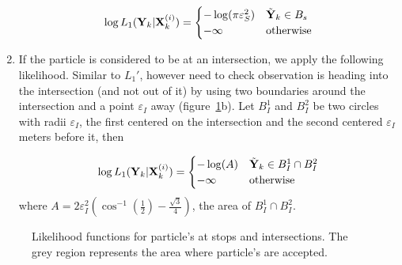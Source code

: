 \documentclass[draftcls,a4paper,onecolumn]{IEEEtran}\usepackage[]{graphicx}\usepackage[]{color}
\newenvironment{knitrout}{}{} %
\begin{document}
\begin{enumerate}
\begin{equation}
  \label{eq:l1b}
  \log L_1(\mathbf{Y}_k | \mathbf{X}_k^{(i)})=
  \begin{cases}
    - \log(\pi \varepsilon_S^2) & \tilde{\mathbf{Y}}_k \in B_s \\
    - \infty & \text{otherwise}
  \end{cases}
\end{equation}

\item
If the particle is considered to be at an intersection, we apply the following likelihood.
Similar to $L_1'$, however need to check observation is heading into the intersection
(and not out of it) by using two boundaries around the intersection and a point $\varepsilon_I$ away
(figure~\ref{fig:likelihood_circles}b).
Let $B_I^1$ and $B_I^2$ be two circles with radii $\varepsilon_I$,
the first centered on the intersection and the second centered $\varepsilon_I$ meters before it, then

\begin{equation}
  \label{eq:l1c}
  \log L_1 (\mathbf{Y}_k | \mathbf{X}_k^{(i)}) =
  \begin{cases}
    - \log(A) & \tilde{\mathbf{Y}}_k \in B_I^1 \cap B_I^2 \\
    - \infty & \text{otherwise}
  \end{cases}
\end{equation}
where $A = 2\varepsilon_I^2 \left( \cos^{-1}(\frac{1}{2}) - \frac{\sqrt{3}}{4} \right)$,
the area of $B_I^1\cap B_I^2$.

\end{enumerate}


\begin{knitrout}
\color{fgcolor}\begin{figure}
\caption[Likelihood functions for particle's at stops and intersections]{Likelihood functions for particle's at stops and intersections. The grey region represents the area where particle's are accepted.}\label{fig:likelihood_circles}
\end{figure}


\end{knitrout}
\end{document}
